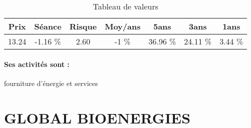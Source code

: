 \documentclass[11pt,a4paper]{report}%
\begin{document}
\begin{table}[H]
  \centering
    \begin{tabular}{|c|c|c|c|c|c|c|}
    \hline
    Prix & Séance & Risque  & Moy/ans & 5ans & 3ans & 1ans \\
    \hline
    13.24 &    -1.16 \%    & 2.60 & -1 \% & 36.96 \% & 24.11 \% & 3.44 \% \\
    \hline
    \end{tabular}%
        \label{tab:table_ENGIE}%
      \caption{Tableau de valeurs}
\end{table}%

\paragraph{Ses activités sont : } fourniture d’énergie et services 
    
    \newpage

\section{GLOBAL BIOENERGIES}
\end{document}
